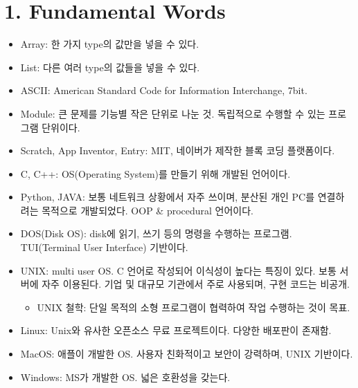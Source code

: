 
\section[1. Fundamental Words - {\it 꼭 알아야 하는 용어들}]{1. Fundamental Words}

\begin{itemize}

\item Array: 한 가지 type의 값만을 넣을 수 있다.
\item List: 다른 여러 type의 값들을 넣을 수 있다.
\item ASCII: American Standard Code for Information Interchange, 7bit.
\item Module: 큰 문제를 기능별 작은 단위로 나눈 것. 독립적으로 수행할 수 있는 프로그램 단위이다.

\item Scratch, App Inventor, Entry: MIT, 네이버가 제작한 블록 코딩 플랫폼이다.
\item C, C++: OS(Operating System)를 만들기 위해 개발된 언어이다.
\item Python, JAVA: 보통 네트워크 상황에서 자주 쓰이며, 분산된 개인 PC를 연결하려는 목적으로 개발되었다. OOP \& procedural 언어이다.

\item DOS(Disk OS): disk에 읽기, 쓰기 등의 명령을 수행하는 프로그램. TUI(Terminal User Interface) 기반이다.
\item UNIX: multi user OS. C 언어로 작성되어 이식성이 높다는 특징이 있다. 보통 서버에 자주 이용된다. 기업 및 대규모 기관에서 주로 사용되며, 구현 코드는 비공개.
\begin{itemize}
  \item UNIX 철학: 단일 목적의 소형 프로그램이 협력하여 작업 수행하는 것이 목표.
\end{itemize}
\item Linux: Unix와 유사한 오픈소스 무료 프로젝트이다. 다양한 배포판이 존재함.
\item MacOS: 애플이 개발한 OS. 사용자 친화적이고 보안이 강력하며, UNIX 기반이다.
\item Windows: MS가 개발한 OS. 넓은 호환성을 갖는다.


\end{itemize}
